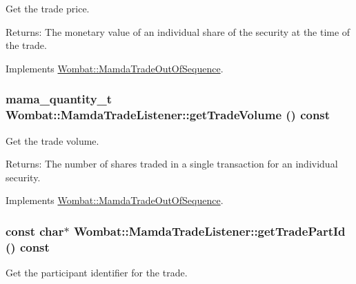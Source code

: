Get the trade price. 

\begin{Desc}
\item[Returns:]The monetary value of an individual share of the security at the time of the trade. \end{Desc}


Implements \hyperlink{classWombat_1_1MamdaTradeOutOfSequence_30fc1ebb7bdf21628684797d5dd7b9c0}{Wombat::Mamda\-Trade\-Out\-Of\-Sequence}.\hypertarget{classWombat_1_1MamdaTradeListener_59830d5b7d9bf0df2e274f8f4ce49cc6}{
\subsubsection[getTradeVolume]{\setlength{\rightskip}{0pt plus 5cm}mama\_\-quantity\_\-t Wombat::Mamda\-Trade\-Listener::get\-Trade\-Volume () const}}
\label{classWombat_1_1MamdaTradeListener_59830d5b7d9bf0df2e274f8f4ce49cc6}


Get the trade volume. 

\begin{Desc}
\item[Returns:]The number of shares traded in a single transaction for an individual security. \end{Desc}


Implements \hyperlink{classWombat_1_1MamdaTradeOutOfSequence_6a7547c47304b1362c3f7df2a5529e2a}{Wombat::Mamda\-Trade\-Out\-Of\-Sequence}.\hypertarget{classWombat_1_1MamdaTradeListener_a9e5a20840963992b58ec19cf717cfab}{
\subsubsection[getTradePartId]{\setlength{\rightskip}{0pt plus 5cm}const char$\ast$ Wombat::Mamda\-Trade\-Listener::get\-Trade\-Part\-Id () const}}
\label{classWombat_1_1MamdaTradeListener_a9e5a20840963992b58ec19cf717cfab}


Get the participant identifier for the trade. 

